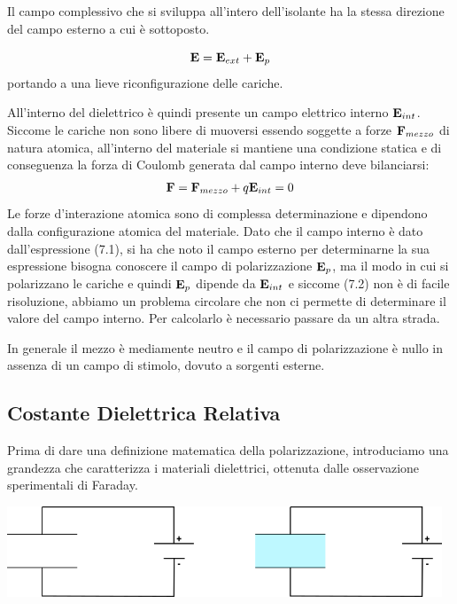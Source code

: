 Il campo complessivo che si sviluppa all'intero dell'isolante  ha la stessa direzione del campo esterno a cui \`e sottoposto.

\begin{equation}
	\bold{E} = \bold{E}_{ext} + \bold{E}_{p}
\end{equation} 
portando a una lieve riconfigurazione delle cariche. 

 All'interno del dielettrico \`e quindi presente un campo elettrico interno $\bold{E}_{int}$. Siccome le cariche non sono libere di muoversi essendo soggette a forze $\bold{F}_{mezzo}$ di natura atomica, all'interno del materiale si mantiene una condizione statica e di conseguenza la forza di Coulomb generata dal campo interno deve bilanciarsi:
\begin{equation}
	\bold{F} = \bold{F}_{mezzo} + q \bold{E}_{int} = 0
\end{equation}
Le forze d'interazione atomica sono di complessa determinazione e dipendono dalla configurazione atomica del materiale.  Dato che il campo interno \`e dato dall'espressione (7.1), si ha che noto il campo esterno per determinarne la sua espressione bisogna conoscere il campo di polarizzazione $\bold{E}_{p}$, ma il modo in cui si polarizzano le cariche e quindi $\bold{E}_{p}$ dipende da $\bold{E}_{int}$ e siccome (7.2) non \`e di facile risoluzione, abbiamo un problema circolare che non ci permette di determinare il valore del campo interno. Per calcolarlo \`e necessario passare da un altra strada.

In generale il mezzo \`e mediamente neutro e il campo di polarizzazione \`e nullo in assenza di un campo di stimolo, dovuto a sorgenti esterne.
\subsection{Costante Dielettrica Relativa}
Prima di dare una definizione matematica della polarizzazione, introduciamo una grandezza che caratterizza i materiali dielettrici, ottenuta dalle osservazione sperimentali di Faraday.

\begin{center}
	\includegraphics[width = 13cm]{images/faraday_exp}
\end{center}

